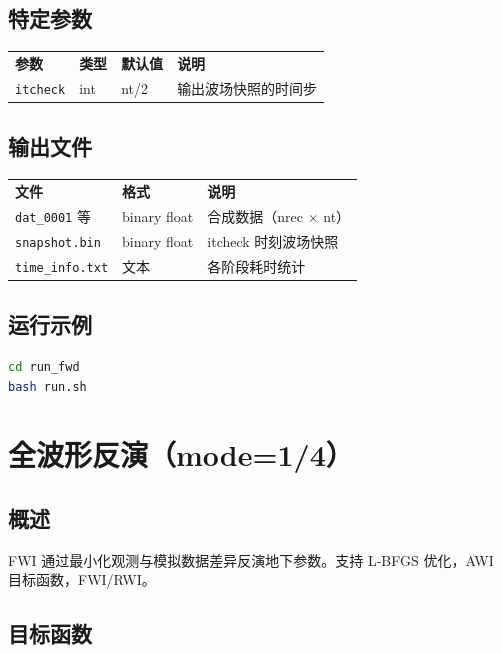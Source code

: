 \documentclass[11pt,a4paper]{ctexart}
\begin{document}
\subsection{特定参数}

\begin{tabular}{lllp{5cm}}
\textbf{参数} & \textbf{类型} & \textbf{默认值} & \textbf{说明} \\
\texttt{itcheck} & int & nt/2 & 输出波场快照的时间步 \\
\end{tabular}

\subsection{输出文件}

\begin{tabular}{llp{5cm}}
\textbf{文件} & \textbf{格式} & \textbf{说明} \\
\texttt{dat\_0001} 等 & binary float & 合成数据（nrec $\times$ nt）\\
\texttt{snapshot.bin} & binary float & itcheck 时刻波场快照 \\
\texttt{time\_info.txt} & 文本 & 各阶段耗时统计 \\
\end{tabular}

\subsection{运行示例}

\begin{lstlisting}[language=bash]
cd run_fwd
bash run.sh
\end{lstlisting}

\section{全波形反演（mode=1/4）}

\subsection{概述}

FWI 通过最小化观测与模拟数据差异反演地下参数。支持 L-BFGS 优化，AWI 目标函数，FWI/RWI。

\subsection{目标函数}
\end{document}
